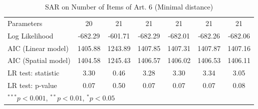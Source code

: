 \begin{table}[!h]
\begin{center}
\begin{tabular}{l c c c c c c }
Parameters              & 20           & 21           & 21           & 21           & 21           & 21           \\
Log Likelihood          & -682.29      & -601.71      & -682.29      & -682.01      & -682.26      & -682.06      \\
AIC (Linear model)      & 1405.88      & 1243.89      & 1407.85      & 1407.31      & 1407.87      & 1407.16      \\
AIC (Spatial model)     & 1404.58      & 1245.43      & 1406.57      & 1406.02      & 1406.53      & 1406.11      \\
LR test: statistic      & 3.30         & 0.46         & 3.28         & 3.30         & 3.34         & 3.05         \\
LR test: p-value        & 0.07         & 0.50         & 0.07         & 0.07         & 0.07         & 0.08         \\
\bottomrule
\multicolumn{7}{l}{\scriptsize{$^{***}p<0.001$, $^{**}p<0.01$, $^*p<0.05$}}
\end{tabular}
\caption{SAR on Number of Items of Art. 6 (Minimal distance)}
\label{table:coefficients}
\end{center}
\end{table}

